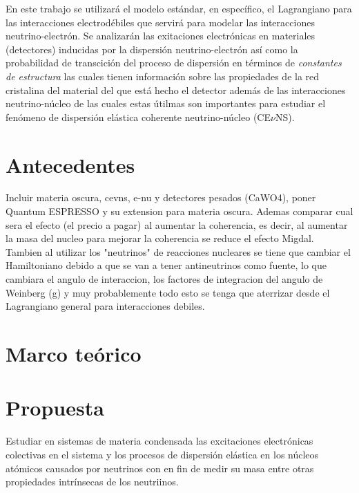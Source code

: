 \documentclass[final,12p]{article}
\begin{document}
  \vspace{0.5cm}
   
En este trabajo se utilizar\'a el modelo est\'andar, en espec\'ifico, el Lagrangiano para las interacciones electrod\'ebiles que servir\'a para modelar las interacciones neutrino-electr\'on. Se analizar\'an las exitaciones electr\'onicas en materiales (detectores) inducidas por la dispersi\'on neutrino-electr\'on  as\'i como la probabilidad de transcici\'on del proceso de dispersi\'on en t\'erminos de \emph{constantes de estructura} las cuales tienen informaci\'on sobre las propiedades de la red cristalina del material del que est\'a hecho el detector adem\'as de las interacciones neutrino-n\'ucleo de las cuales estas \'utilmas son importantes para estudiar el fen\'omeno de dispersi\'on el\'astica coherente neutrino-n\'ucleo (CE$\nu$NS).

  \hspace{2pt}
\vfill

\newpage

\section{Antecedentes}

Incluir materia oscura, cevns, e-nu y detectores pesados (CaWO4), poner Quantum ESPRESSO y su extension para materia oscura. Ademas comparar cual sera el efecto (el precio a pagar) al aumentar la coherencia, es decir, al aumentar la masa del nucleo para mejorar la coherencia se reduce el efecto Migdal. Tambien al utilizar los "neutrinos" de reacciones nucleares se tiene que cambiar el Hamiltoniano debido a que se van a tener antineutrinos como fuente, lo que cambiara el angulo de interaccion, los factores de integracion del angulo de Weinberg (g) y muy probablemente todo esto se tenga que aterrizar desde el Lagrangiano general para interacciones debiles.
\section{Marco te\'orico}



\section{Propuesta}

Estudiar en sistemas de materia condensada las excitaciones electr\'onicas colectivas en el sistema y los procesos de dispersi\'on el\'astica en los n\'ucleos at\'omicos causados por neutrinos con en fin de medir su masa entre otras propiedades intr\'insecas de los neutriinos. 
\end{document}
